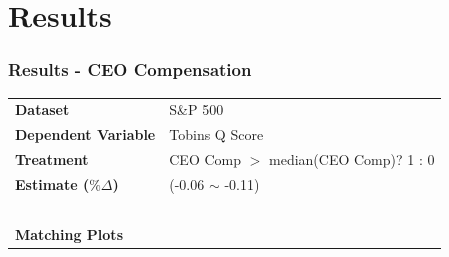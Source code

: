 \documentclass{beamer}
\begin{document}
\section {Results}
\begin{frame}[t]
\frametitle{Results - CEO Compensation}
\begin{tabular}{ll}
{\bf Dataset} & S\&P 500  \\
{\bf Dependent Variable} & Tobins Q Score \\
{\bf Treatment} & CEO Comp $>$ median(CEO Comp)? 1 : 0  \\
{\bf Estimate ($\% \Delta $)} &  (-0.06 $\sim$ -0.11) \\~\\
{\bf Matching Plots} &
\end{tabular}
\vspace{-0.8cm}
\begin{figure}[h!]
\centering
\footnotesize{}
\footnotesize{ }
\footnotesize{ }
\end{figure}
\end{frame}
\end{document}
